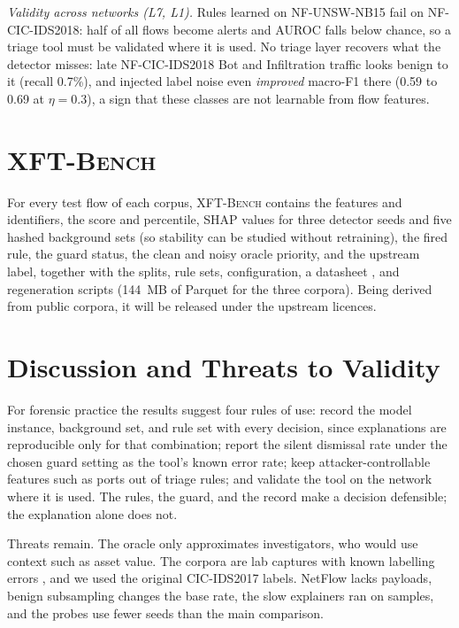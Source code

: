 \documentclass[journal]{IEEEtran}
\begin{document}
\emph{Validity across networks (L7, L1).} Rules learned on NF-UNSW-NB15 fail on NF-CIC-IDS2018: half of all flows become alerts and AUROC falls below chance, so a triage tool must be validated where it is used. No triage layer recovers what the detector misses: late NF-CIC-IDS2018 Bot and Infiltration traffic looks benign to it (recall 0.7\%), and injected label noise even \emph{improved} macro-F1 there (0.59 to 0.69 at $\eta=0.3$), a sign that these classes are not learnable from flow features.

\section{\textsc{XFT-Bench}}
\label{sec:bench}
For every test flow of each corpus, \textsc{XFT-Bench} contains the features and identifiers, the score and percentile, SHAP values for three detector seeds and five hashed background sets (so stability can be studied without retraining), the fired rule, the guard status, the clean and noisy oracle priority, and the upstream label, together with the splits, rule sets, configuration, a datasheet \cite{gebru}, and regeneration scripts (144~MB of Parquet for the three corpora). Being derived from public corpora, it will be released under the upstream licences.

\section{Discussion and Threats to Validity}
\label{sec:discussion}
For forensic practice the results suggest four rules of use: record the model instance, background set, and rule set with every decision, since explanations are reproducible only for that combination; report the silent dismissal rate under the chosen guard setting as the tool's known error rate; keep attacker-controllable features such as ports out of triage rules; and validate the tool on the network where it is used. The rules, the guard, and the record make a decision defensible; the explanation alone does not.

Threats remain. The oracle only approximates investigators, who would use context such as asset value. The corpora are lab captures with known labelling errors \cite{engelen,sommer}, and we used the original CIC-IDS2017 labels. NetFlow lacks payloads, benign subsampling changes the base rate, the slow explainers ran on samples, and the probes use fewer seeds than the main comparison.
\end{document}
